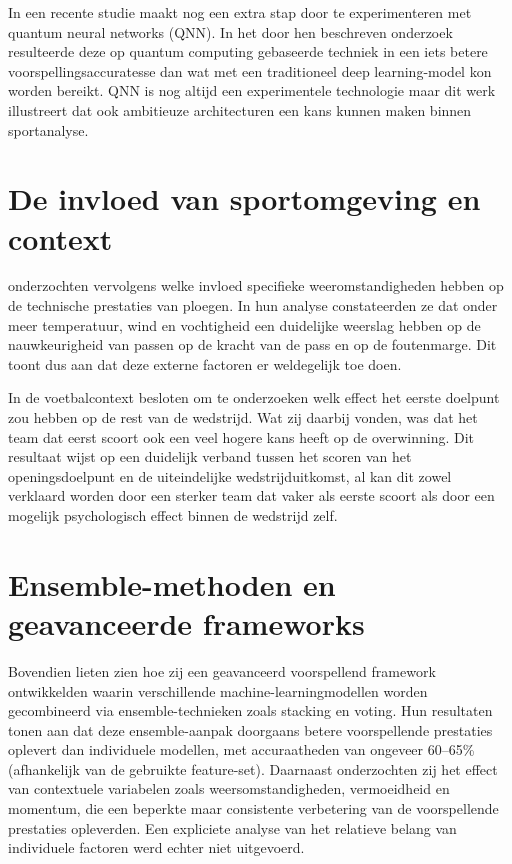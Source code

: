 In een recente studie maakt \textcite{Sun2025} nog een extra stap door te experimenteren met quantum neural networks (QNN).
In het door hen beschreven onderzoek resulteerde deze op quantum computing gebaseerde techniek in een iets betere voorspellingsaccuratesse dan wat met een traditioneel deep learning-model kon worden bereikt.
QNN is nog altijd een experimentele technologie maar dit werk illustreert dat ook ambitieuze architecturen een kans kunnen maken binnen sportanalyse.

\vspace{5pt}

\section{De invloed van sportomgeving en context}

\textcite{Zhong2024} onderzochten vervolgens welke invloed specifieke weeromstandigheden hebben op de technische prestaties van ploegen.
In hun analyse constateerden ze dat onder meer temperatuur, wind en vochtigheid een duidelijke weerslag hebben op de nauwkeurigheid van passen
op de kracht van de pass en op de foutenmarge.
Dit toont dus aan dat deze externe factoren er weldegelijk toe doen.

\vspace{5pt}

In de voetbalcontext besloten \textcite{LagoPenas2017} om te onderzoeken welk effect het eerste doelpunt zou hebben 
op de rest van de wedstrijd.
Wat zij daarbij vonden, was dat het team dat eerst scoort ook een veel hogere kans heeft op de overwinning. 
Dit resultaat wijst op een duidelijk verband tussen het scoren van het openingsdoelpunt en de uiteindelijke wedstrijduitkomst, 
al kan dit zowel verklaard worden door een sterker team dat vaker als eerste scoort als door een mogelijk psychologisch effect binnen de wedstrijd zelf.

\vspace{5pt}

\section{Ensemble-methoden en geavanceerde frameworks}

Bovendien lieten \textcite{Wong2025} zien hoe zij een geavanceerd voorspellend framework ontwikkelden waarin verschillende machine-learningmodellen 
worden gecombineerd via ensemble-technieken zoals stacking en voting. 
Hun resultaten tonen aan dat deze ensemble-aanpak doorgaans betere voorspellende prestaties oplevert dan individuele modellen, 
met accuraatheden van ongeveer 60--65\% (afhankelijk van de gebruikte feature-set). 
Daarnaast onderzochten zij het effect van contextuele variabelen zoals weersomstandigheden, vermoeidheid en momentum, 
die een beperkte maar consistente verbetering van de voorspellende prestaties opleverden. 
Een expliciete analyse van het relatieve belang van individuele factoren werd echter niet uitgevoerd.

